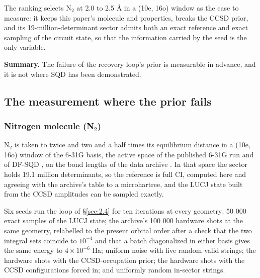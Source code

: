 \documentclass[11pt]{article}
\begin{document}
The ranking selects N$_2$ at 2.0 to 2.5 \AA{} in a (10e, 16o) window as the case to measure: it keeps this paper's molecule and properties, breaks the CCSD prior, and its 19-million-determinant sector admits both an exact reference and exact sampling of the circuit state, so that the information carried by the seed is the only variable.

\textbf{Summary.} The failure of the recovery loop's prior is measurable in advance, and it is not where SQD has been demonstrated.

\subsection{The measurement where the prior fails}\label{sec:3.6}


\subsubsection{\texorpdfstring{Nitrogen molecule (N$_2$)}{Nitrogen molecule (N2)}}\label{sec:3.6.1}


N$_2$ is taken to twice and two and a half times its equilibrium distance in a (10e, 16o) window of the 6-31G basis, the active space of the published 6-31G run and of DF-SQD \cite{AgarwalRay2026}, on the bond lengths of the data archive \cite{IBMdata}. In that space the sector holds 19.1 million determinants, so the reference is full CI, computed here and agreeing with the archive's table to a microhartree, and the LUCJ state built from the CCSD amplitudes can be sampled exactly.

Six seeds run the loop of \S\ref{sec:2.4} for ten iterations at every geometry: 50 000 exact samples of the LUCJ state; the archive's 100 000 hardware shots at the same geometry, relabelled to the present orbital order after a check that the two integral sets coincide to $10^{-4}$ and that a batch diagonalized in either basis gives the same energy to $4\times10^{-6}$ Ha; uniform noise with five random valid strings; the hardware shots with the CCSD-occupation prior; the hardware shots with the CCSD configurations forced in; and uniformly random in-sector strings.
\end{document}
